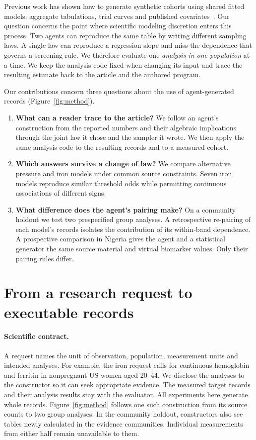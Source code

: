 \documentclass[sigconf,anonymous,review]{acmart}
\begin{document}
Previous work has shown how to generate synthetic cohorts using shared fitted models, aggregate tabulations, trial curves and published covariates~\cite{filshtein,llmsynthor,synthipd,kmgen}. Our question concerns the point where scientific modeling discretion enters this process. Two agents can reproduce the same table by writing different sampling laws. A single law can reproduce a regression slope and miss the dependence that governs a screening rule. We therefore evaluate one \emph{analysis in one population} at a time. We keep the analysis code fixed when changing its input and trace the resulting estimate back to the article and the authored program.

Our contributions concern three questions about the use of agent-generated records (Figure~\ref{fig:method}).
\begin{enumerate}
\item \textbf{What can a reader trace to the article?} We follow an agent's construction from the reported numbers and their algebraic implications through the joint law it chose and the sampler it wrote. We then apply the same analysis code to the resulting records and to a measured cohort.
\item \textbf{Which answers survive a change of law?} We compare alternative pressure and iron models under common source constraints. Seven iron models reproduce similar threshold odds while permitting continuous associations of different signs.
\item \textbf{What difference does the agent's pairing make?} On a community holdout we test two prespecified group analyses. A retrospective re-pairing of each model's records isolates the contribution of its within-band dependence. A prospective comparison in Nigeria gives the agent and a statistical generator the same source material and virtual biomarker values. Only their pairing rules differ.
\end{enumerate}

\section{From a research request to executable records}
\label{sec:method}



\paragraph{Scientific contract.}
A request names the unit of observation, population, measurement units and intended analyses. For example, the iron request calls for continuous hemoglobin and ferritin in nonpregnant US women aged 20--44. We disclose the analyses to the constructor so it can seek appropriate evidence. The measured target records and their analysis results stay with the evaluator. All experiments here generate whole records. Figure~\ref{fig:method} follows one such construction from its source counts to two group analyses. In the community holdout, constructors also see tables newly calculated in the evidence communities. Individual measurements from either half remain unavailable to them.
\end{document}
